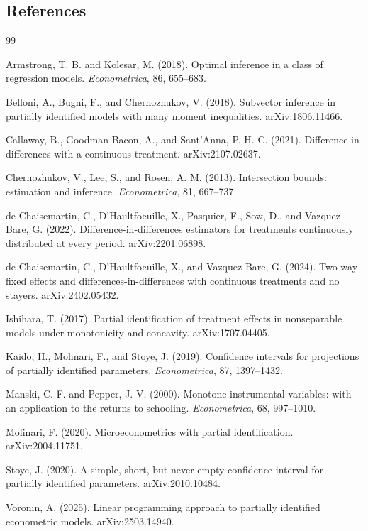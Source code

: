 \documentclass[11pt]{article}
\theoremstyle{definition}
\theoremstyle{plain}
\theoremstyle{remark}
\begin{document}
\subsection*{References}
\begin{thebibliography}{99}

Armstrong, T. B. and Kolesar, M. (2018).
Optimal inference in a class of regression models.
\textit{Econometrica}, 86, 655--683.

Belloni, A., Bugni, F., and Chernozhukov, V. (2018).
Subvector inference in partially identified models with many moment
inequalities.
arXiv:1806.11466.

Callaway, B., Goodman-Bacon, A., and Sant'Anna, P. H. C. (2021).
Difference-in-differences with a continuous treatment.
arXiv:2107.02637.

Chernozhukov, V., Lee, S., and Rosen, A. M. (2013).
Intersection bounds: estimation and inference.
\textit{Econometrica}, 81, 667--737.

de Chaisemartin, C., D'Haultfoeuille, X., Pasquier, F., Sow, D., and
Vazquez-Bare, G. (2022).
Difference-in-differences estimators for treatments continuously distributed at
every period.
arXiv:2201.06898.

de Chaisemartin, C., D'Haultfoeuille, X., and Vazquez-Bare, G. (2024).
Two-way fixed effects and differences-in-differences with continuous
treatments and no stayers.
arXiv:2402.05432.

Ishihara, T. (2017).
Partial identification of treatment effects in nonseparable models under
monotonicity and concavity.
arXiv:1707.04405.

Kaido, H., Molinari, F., and Stoye, J. (2019).
Confidence intervals for projections of partially identified parameters.
\textit{Econometrica}, 87, 1397--1432.

Manski, C. F. and Pepper, J. V. (2000).
Monotone instrumental variables: with an application to the returns to
schooling.
\textit{Econometrica}, 68, 997--1010.

Molinari, F. (2020).
Microeconometrics with partial identification.
arXiv:2004.11751.

Stoye, J. (2020).
A simple, short, but never-empty confidence interval for partially identified
parameters.
arXiv:2010.10484.

Voronin, A. (2025).
Linear programming approach to partially identified econometric models.
arXiv:2503.14940.

\end{thebibliography}
\end{document}
